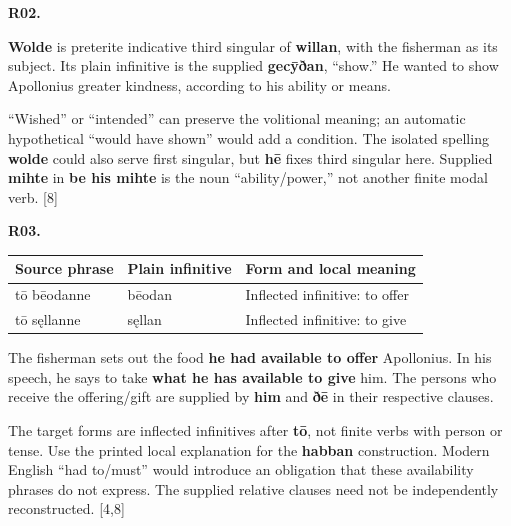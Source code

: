 \par\begin{minipage}{\linewidth}\raggedright
\textbf{R02.}

\textbf{Wolde} is preterite indicative third singular of \textbf{willan}, with the fisherman as its subject. Its plain infinitive is the supplied \textbf{gecȳðan}, “show.” He wanted to show Apollonius greater kindness, according to his ability or means.

“Wished” or “intended” can preserve the volitional meaning; an automatic hypothetical “would have shown” would add a condition. The isolated spelling \textbf{wolde} could also serve first singular, but \textbf{hē} fixes third singular here. Supplied \textbf{mihte} in \textbf{be his mihte} is the noun “ability/\allowbreak{}power,” not another finite modal verb. [8]

\end{minipage}\par\addvspace{4pt}

\par\begin{minipage}{\linewidth}\raggedright
\textbf{R03.}

\par\begingroup
\fontsize{10.5}{13.2}\selectfont
\setlength{\LTleft}{0pt}\setlength{\LTright}{\fill}
\noindent
\begin{tabular}{@{}>{\raggedright\arraybackslash}p{28.55mm}>{\raggedright\arraybackslash}p{35.37mm}>{\raggedright\arraybackslash}p{54.45mm}@{}}
\toprule
\textbf{Source phrase} & \textbf{Plain infinitive} & \textbf{Form and local meaning} \\
\midrule
tō bēodanne & bēodan & Inflected infinitive: to offer \\
tō sęllanne & sęllan & Inflected infinitive: to give \\
\bottomrule
\end{tabular}
\par\endgroup

The fisherman sets out the food \textbf{he had available to offer} Apollonius. In his speech, he says to take \textbf{what he has available to give} him. The persons who receive the offering/\allowbreak{}gift are supplied by \textbf{him} and \textbf{ðē} in their respective clauses.

The target forms are inflected infinitives after \textbf{tō}, not finite verbs with person or tense. Use the printed local explanation for the \textbf{habban} construction. Modern English “had to/\allowbreak{}must” would introduce an obligation that these availability phrases do not express. The supplied relative clauses need not be independently reconstructed. [4,8]

\end{minipage}\par\addvspace{4pt}

